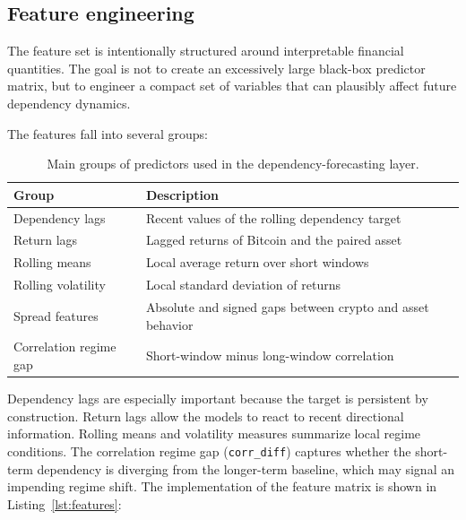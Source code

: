 \subsection{Feature engineering}

The feature set is intentionally structured around interpretable financial quantities. The goal is not to create an excessively large black-box predictor matrix, but to engineer a compact set of variables that can plausibly affect future dependency dynamics.

The features fall into several groups:

\begin{table}[H]
    \centering
    \caption{Main groups of predictors used in the dependency-forecasting layer.}
    \label{tab:feature_groups}
    \begin{tabular}{ll}
        \toprule
        Group & Description \\
        \midrule
        Dependency lags & Recent values of the rolling dependency target \\
        Return lags & Lagged returns of Bitcoin and the paired asset \\
        Rolling means & Local average return over short windows \\
        Rolling volatility & Local standard deviation of returns \\
        Spread features & Absolute and signed gaps between crypto and asset behavior \\
        Correlation regime gap & Short-window minus long-window correlation \\
        \bottomrule
    \end{tabular}
\end{table}

Dependency lags are especially important because the target is persistent by construction. Return lags allow the models to react to recent directional information. Rolling means and volatility measures summarize local regime conditions. The correlation regime gap (\texttt{corr\_diff}) captures whether the short-term dependency is diverging from the longer-term baseline, which may signal an impending regime shift. The implementation of the feature matrix is shown in Listing~\ref{lst:features}:

